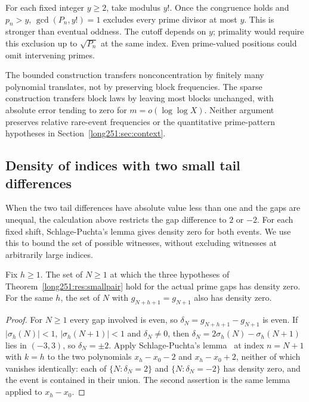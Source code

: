 For each fixed integer $y\ge2$, take modulus $y!$.
Once the congruence holds and $p_n>y$, $\gcd(P_n,y!)=1$ excludes every
prime divisor at most $y$.  This is stronger than eventual oddness.
The cutoff depends on $y$; primality would require this exclusion up to
$\sqrt{P_n}$ at the same index.  Even prime-valued positions could omit
intervening primes.

The bounded construction transfers nonconcentration by finitely many
polynomial translates, not by preserving block frequencies.  The sparse
construction transfers block laws by leaving most blocks unchanged, with
absolute error tending to zero for $m=o(\log\log X)$.  Neither argument
preserves relative rare-event frequencies or the quantitative prime-pattern
hypotheses in Section~\ref{long251:sec:context}.

\subsection{Density of indices with two small tail differences}

When the two tail differences have absolute value less than one and the
gaps are unequal, the calculation above restricts the gap difference to
$2$ or $-2$.  For each fixed shift, Schlage-Puchta's lemma gives density zero
for both events.  We use this to bound the set of possible witnesses,
without excluding witnesses at arbitrarily large indices.

\begin{theorem}\label{long251:res:sparse}
Fix $h\ge1$.  The set of $N\ge1$ at which the three hypotheses of
Theorem~\ref{long251:res:smallpair} hold for the actual prime gaps has density zero.
For the same $h$, the set of $N$ with $g_{N+h+1}=g_{N+1}$ also has density
zero.
\end{theorem}


\begin{proof}
For $N\ge1$ every gap involved is even, so $\delta_N=g_{N+h+1}-g_{N+1}$ is
even.  If $|\sigma_h(N)|<1$, $|\sigma_h(N+1)|<1$ and $\delta_N\ne0$, then
$\delta_N=2\sigma_h(N)-\sigma_h(N+1)$ lies in $(-3,3)$, so $\delta_N=\pm2$.
Apply Schlage-Puchta's lemma~\cite[Lemma~4]{schlagepuchta2011} at index
$n=N+1$ with $k=h$ to the two
polynomials $x_h-x_0-2$ and $x_h-x_0+2$, neither of which vanishes
identically: each of $\{N:\delta_N=2\}$ and $\{N:\delta_N=-2\}$ has density
zero, and the event is contained in their union.  The second assertion is the
same lemma applied to $x_h-x_0$.
\end{proof}

